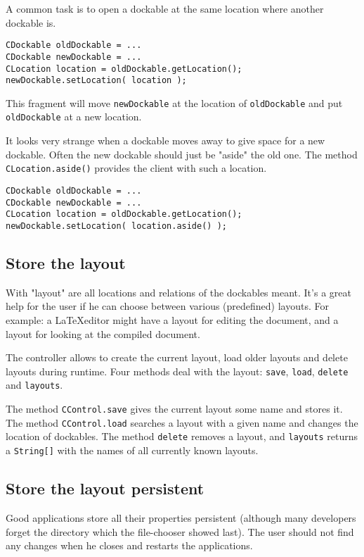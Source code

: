 \documentclass[a4paper,10pt]{article}
\newcommand{\src}[1]{\lstinline[basicstyle=\ttfamily]|#1|}
\begin{document}
A common task is to open a dockable at the same location where another dockable is.
\begin{lstlisting}
CDockable oldDockable = ...
CDockable newDockable = ...
CLocation location = oldDockable.getLocation();
newDockable.setLocation( location );
\end{lstlisting}
This fragment will move \src{newDockable} at the location of \src{oldDockable} and put \src{oldDockable} at a new location.

It looks very strange when a dockable moves away to give space for a new dockable. Often the new dockable should just be "aside" the old one. The method \src{CLocation.aside()} provides the client with such a location.
\begin{lstlisting}
CDockable oldDockable = ...
CDockable newDockable = ...
CLocation location = oldDockable.getLocation();
newDockable.setLocation( location.aside() );
\end{lstlisting}

\subsection{Store the layout}
With "layout" are all locations and relations of the dockables meant. It's a great help for the user if he can choose between various (predefined) layouts. For example: a \LaTeX editor might have a layout for editing the document, and a layout for looking at the compiled document.

The controller allows to create the current layout, load older layouts and delete layouts during runtime. Four methods deal with the layout: \src{save}, \src{load}, \src{delete} and \src{layouts}.

The method \src{CControl.save} gives the current layout some name and stores it. The method \src{CControl.load} searches a layout with a given name and changes the location of dockables. The method \src{delete} removes a layout, and \src{layouts} returns a \src{String[]} with the names of all currently known layouts.

\subsection{Store the layout persistent}
Good applications store all their properties persistent (although many developers forget the directory which the file-chooser showed last). The user should not find any changes when he closes and restarts the applications.
\end{document}

